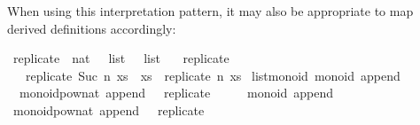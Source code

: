 \begin{isabellebody}
\begin{isamarkuptext}
  When using this interpretation pattern, it may also
  be appropriate to map derived definitions accordingly:%
\end{isamarkuptext}%
\isamarkuptrue%
%
\isadelimquote
%
\endisadelimquote
%
\isatagquote
{}\isamarkupfalse%
\ replicate\ {}{}\ {}nat\ {}\ {}\ list\ {}\ {}\ list{}\ \isanewline
\ \ {}replicate\ {}\ {}\ {}\ {}{}{}\isanewline
\ \ {}\ {}replicate\ {}Suc\ n{}\ xs\ {}\ xs\ {}\ replicate\ n\ xs{}\isanewline
\isanewline
{}\isamarkupfalse%
\ list{}monoid{}\ monoid\ append\ {}{}{}{}\ \isanewline
\ \ {}monoid{}pow{}nat\ append\ {}{}\ {}\ replicate{}\isanewline
{}\isamarkupfalse%
\ {}\isanewline
\ \ \isamarkupfalse%
\ monoid\ append\ {}{}{}{}\ \isamarkupfalse%
\isanewline
\ \ \isamarkupfalse%
\ {}monoid{}pow{}nat\ append\ {}{}\ {}\ replicate{}\isanewline

\end{isabellebody}

